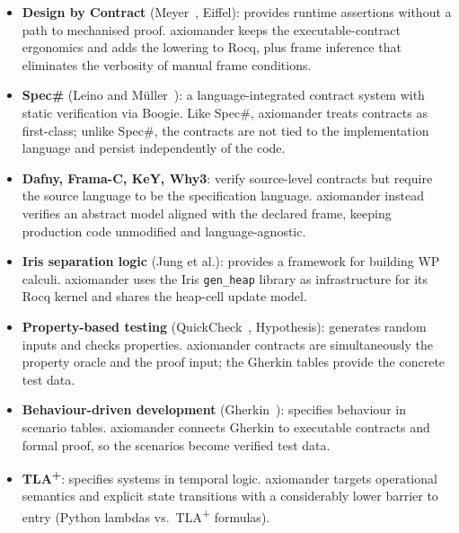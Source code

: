 \documentclass[11pt,a4paper]{article}
\begin{document}
\begin{itemize}[leftmargin=*]

\item \textbf{Design by Contract} (Meyer~\cite{Meyer92}, Eiffel):
provides runtime assertions without a path to mechanised proof.
\textsf{axiomander} keeps the executable-contract ergonomics and adds
the lowering to Rocq, plus frame inference that eliminates the
verbosity of manual frame conditions.

\item \textbf{Spec\#} (Leino and M\"uller~\cite{Leino10}): a
language-integrated contract system with static verification via
Boogie.  Like Spec\#, \textsf{axiomander} treats contracts as
first-class; unlike Spec\#, the contracts are not tied to the
implementation language and persist independently of the code.

\item \textbf{Dafny, Frama-C, KeY, Why3}: verify source-level
contracts but require the source language to be the specification
language.  \textsf{axiomander} instead verifies an abstract model
aligned with the declared frame, keeping production code unmodified
and language-agnostic.

\item \textbf{Iris separation logic} (Jung et al.): provides a
framework for building WP calculi.  \textsf{axiomander} uses the Iris
\texttt{gen\_heap} library as infrastructure for its Rocq kernel and
shares the heap-cell update model.

\item \textbf{Property-based testing} (QuickCheck~\cite{QuickCheck},
Hypothesis): generates random inputs and checks properties.
\textsf{axiomander} contracts are simultaneously the property oracle
and the proof input; the Gherkin tables provide the concrete test
data.

\item \textbf{Behaviour-driven development} (Gherkin~\cite{Gherkin}):
specifies behaviour in scenario tables.  \textsf{axiomander} connects
Gherkin to executable contracts and formal proof, so the scenarios
become verified test data.

\item \textbf{TLA\textsuperscript{+}}: specifies systems in temporal
logic.  \textsf{axiomander} targets operational semantics and
explicit state transitions with a considerably lower barrier to entry
(Python lambdas vs.\ TLA\textsuperscript{+} formulas).

\end{itemize}
\end{document}
